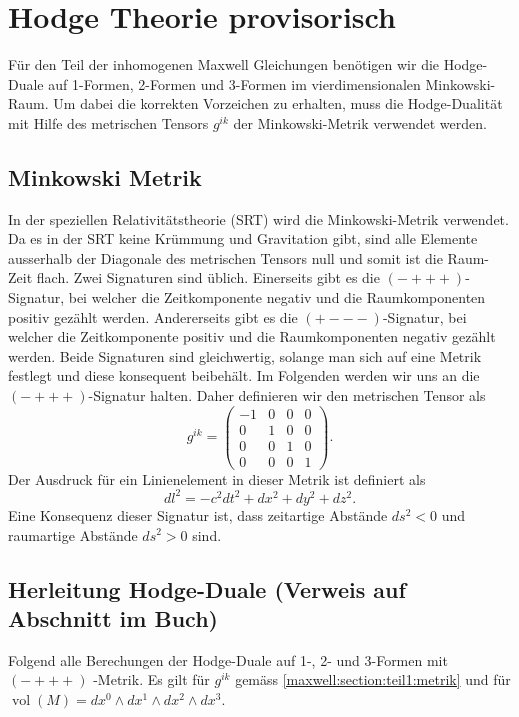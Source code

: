 %
%
%
%
\section{Hodge Theorie provisorisch
\label{maxwell:section:teil1}}
Für den Teil der inhomogenen Maxwell Gleichungen benötigen wir die Hodge-Duale auf 1-Formen, 2-Formen und 3-Formen im vierdimensionalen Minkowski-Raum.
Um dabei die korrekten Vorzeichen zu erhalten, muss die Hodge-Dualität mit Hilfe des metrischen Tensors $g^{ik}$  der Minkowski-Metrik verwendet werden.



\subsection{Minkowski Metrik}
In der speziellen Relativitätstheorie (SRT) wird die Minkowski-Metrik verwendet.
Da es in der SRT keine Krümmung und Gravitation gibt, sind alle Elemente ausserhalb der Diagonale des metrischen Tensors null und somit ist die Raum-Zeit flach.
Zwei Signaturen sind üblich.
Einerseits gibt es die $(-+++)$-Signatur, bei welcher die Zeitkomponente negativ und die Raumkomponenten positiv gezählt werden.
Andererseits gibt es die $(+---)$-Signatur, bei welcher die Zeitkomponente positiv und die Raumkomponenten negativ gezählt werden.
Beide Signaturen sind gleichwertig, solange man sich auf eine Metrik festlegt und diese konsequent beibehält.
Im Folgenden werden wir uns an die $(-+++)$-Signatur halten.
Daher definieren wir den metrischen Tensor als
\begin{equation}
	g^{ik} = \begin{pmatrix}
		-1 & 0 & 0 & 0 \\ 0 & 1 & 0 & 0 \\ 0 & 0 & 1 & 0 \\ 0 & 0 & 0 & 1 
	\end{pmatrix}.
	\label{maxwell:section:teil1:metrik}
\end{equation}
Der Ausdruck für ein Linienelement in dieser Metrik ist definiert als
\begin{equation}
	dl^2 = -c^2dt^2 +dx^2+dy^2+dz^2.
\end{equation}
Eine Konsequenz dieser Signatur ist, dass zeitartige Abstände $ds^2 < 0$ und raumartige Abstände $ds^2 > 0$ sind.


\subsection{Herleitung Hodge-Duale (Verweis auf Abschnitt im Buch)}
Folgend alle Berechungen der Hodge-Duale auf 1-, 2- und 3-Formen mit $(-+++)$ -Metrik.
Es gilt für $g^{ik}$ gemäss \eqref{maxwell:section:teil1:metrik} und für $ \operatorname{vol}(M) = dx^0 \wedge dx^1 \wedge dx^2 \wedge dx^3$.

